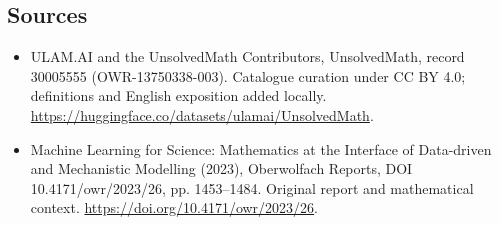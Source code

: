 \documentclass[11pt]{article}
\begin{document}
\subsection{Sources}
\begin{itemize}
\item[\hypertarget{source:30005555:1}{S1}] ULAM.AI and the UnsolvedMath Contributors, UnsolvedMath, record 30005555 (OWR-13750338-003). Catalogue curation under CC BY 4.0; definitions and English exposition added locally.
\url{https://huggingface.co/datasets/ulamai/UnsolvedMath}.
\item[\hypertarget{source:30005555:2}{S2}] Machine Learning for Science: Mathematics at the Interface of Data-driven and Mechanistic Modelling (2023), Oberwolfach Reports, DOI 10.4171/owr/2023/26, pp. 1453--1484. Original report and mathematical context.
\url{https://doi.org/10.4171/owr/2023/26}.
\end{itemize}
\label{end:30005555}
\end{document}
